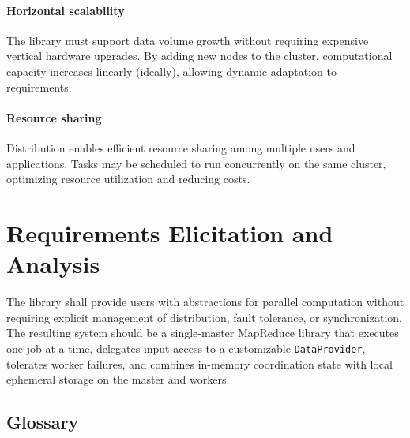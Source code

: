 \documentclass{scrartcl}
\begin{document}
\paragraph{Horizontal scalability}
The library must support data volume growth without requiring expensive vertical hardware upgrades. By adding new nodes to the cluster, computational capacity increases linearly (ideally), allowing dynamic adaptation to requirements.

\paragraph{Resource sharing}
Distribution enables efficient resource sharing among multiple users and applications. Tasks may be scheduled to run concurrently on the same cluster, optimizing resource utilization and reducing costs.

\section{Requirements Elicitation and Analysis}\label{requirements}

The library shall provide users with abstractions for parallel computation without requiring explicit management of distribution, fault tolerance, or synchronization. The resulting system should be a single-master MapReduce library that executes one job at a time, delegates input access to a customizable \texttt{DataProvider}, tolerates worker failures, and combines in-memory coordination state with local ephemeral storage on the master and workers.

\subsection{Glossary}
\end{document}
